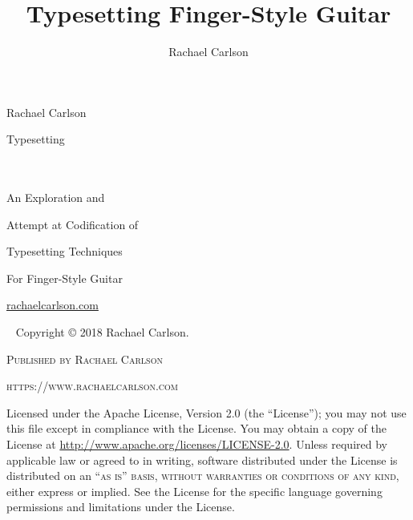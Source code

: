\documentclass[]{memoir}
\title{Typesetting Finger-Style Guitar}
\author{Rachael Carlson}
\begin{document}
\frontmatter

\pagestyle{empty}
\begin{flushright}
  Rachael Carlson\\
\end{flushright}
\vspace*{1in}
{\Huge \textsf{Typesetting}}\\

\vspace*{.15in}
\\

\vspace*{.15in}
\\
\begin{flushright}
  {\Large An Exploration and} \\
\end{flushright}
\begin{flushright}
  {\Large Attempt at Codification of} \\
\end{flushright}
\begin{flushright}
  {\Large Typesetting Techniques}\\
\end{flushright}
\begin{flushright}
  {\Large For Finger-Style Guitar}\\
\end{flushright}

\vspace*{1in}

\url{rachaelcarlson.com}

\clearpage
\newpage
  ~\vfill
  \thispagestyle{empty}
  \noindent Copyright © 2018 Rachael Carlson.

  \noindent \par\textsc{Published by Rachael Carlson}

  \noindent \par\textsc{https://www.rachaelcarlson.com}

  \noindent \par Licensed under the Apache License, Version 2.0 (the
  ``License''); you may not use this file except in compliance with
  the License. You may obtain a copy of the License at \url{http://www.apache.org/licenses/LICENSE-2.0}.
  Unless required by
  applicable law or agreed to in writing, software distributed under
  the License is distributed on an \textsc{``as is'' basis, without
    warranties or conditions of any kind}, either express or
  implied. See the License for the specific language governing
  permissions and limitations under the License.
\end{document}
